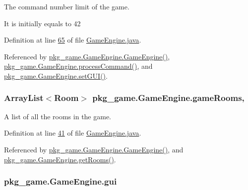 The command number limit of the game. 

It is initially equals to 42 

Definition at line \hyperlink{GameEngine_8java_source_l00065}{65} of file \hyperlink{GameEngine_8java_source}{Game\-Engine.\-java}.



Referenced by \hyperlink{GameEngine_8java_source_l00070}{pkg\-\_\-game.\-Game\-Engine.\-Game\-Engine()}, \hyperlink{GameEngine_8java_source_l00226}{pkg\-\_\-game.\-Game\-Engine.\-process\-Command()}, and \hyperlink{GameEngine_8java_source_l00083}{pkg\-\_\-game.\-Game\-Engine.\-set\-G\-U\-I()}.

\hypertarget{classpkg__game_1_1GameEngine_a4b4afca13ceeb1057e50471670bf3306}{
\subsubsection[{game\-Rooms}]{\setlength{\rightskip}{0pt plus 5cm}Array\-List$<${\bf Room}$>$ pkg\-\_\-game.\-Game\-Engine.\-game\-Rooms\hspace{0.3cm}{\ttfamily [static]}, {\ttfamily [private]}}}\label{classpkg__game_1_1GameEngine_a4b4afca13ceeb1057e50471670bf3306}


A list of all the rooms in the game. 



Definition at line \hyperlink{GameEngine_8java_source_l00041}{41} of file \hyperlink{GameEngine_8java_source}{Game\-Engine.\-java}.



Referenced by \hyperlink{GameEngine_8java_source_l00070}{pkg\-\_\-game.\-Game\-Engine.\-Game\-Engine()}, and \hyperlink{GameEngine_8java_source_l00289}{pkg\-\_\-game.\-Game\-Engine.\-get\-Rooms()}.

\hypertarget{classpkg__game_1_1GameEngine_a152cd31474cc8a5980e32c2cab6e7d36}{
\subsubsection[{gui}]{ pkg\-\_\-game.\-Game\-Engine.\-gui\hspace{0.3cm}{\ttfamily [private]}}}\label{classpkg__game_1_1GameEngine_a152cd31474cc8a5980e32c2cab6e7d36}


